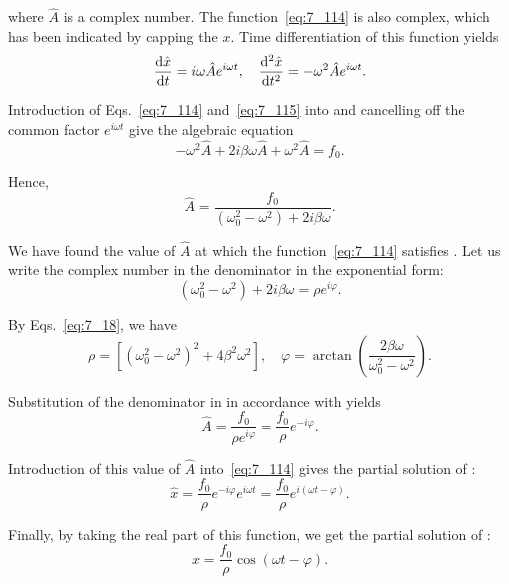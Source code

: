 \noindent
where $\hat{A}$ is a complex number. The function~\eqref{eq:7_114} is also complex, which has been indicated by capping the $x$. Time differentiation of this function yields
\begin{equation}\label{eq:7_115}
	\frac{\mathrm{d}\hat{x}}{\mathrm{d} t} = i\omega \hat{A} e^{i\omega t},\quad \frac{\mathrm{d}^2\hat{x}}{\mathrm{d} t^2} = -\omega^2 \hat{A} e^{i\omega t}.
\end{equation}

\noindent
Introduction of Eqs.~\eqref{eq:7_114} and~\eqref{eq:7_115} into  and cancelling off the common factor $e^{i\omega t}$ give the algebraic equation
\begin{equation*}
	- \omega^2 \hat{A} + 2i\beta\omega\hat{A} + \omega^2\hat{A} = f_0.
\end{equation*}

\noindent
Hence,
\begin{equation}\label{eq:7_116}
	\hat{A} = \frac{f_0}{\left(\omega_0^2 - \omega^2\right) + 2i\beta\omega}.
\end{equation}

\noindent
We have found the value of $\hat{A}$ at which the function~\eqref{eq:7_114} satisfies . Let us write the complex number in the denominator in the exponential form:
\begin{equation}\label{eq:7_117}
	\left(\omega_0^2 - \omega^2\right) + 2i\beta\omega = \rho e^{i\varphi}.
\end{equation}

\noindent
By Eqs.~\eqref{eq:7_18}, we have
\begin{equation}\label{eq:7_118}
	\rho = \left[\left(\omega_0^2 - \omega^2\right)^2 + 4\beta^2\omega^2\right],\quad  \varphi = \arctan\left(\frac{2\beta\omega}{\omega_0^2 - \omega^2}\right).
\end{equation}

Substitution of the denominator in  in accordance with  yields
\begin{equation*}
	\hat{A} = \frac{f_0}{\rho e^{i\varphi}} = \frac{f_0}{\rho}e^{-i\varphi}.
\end{equation*}

\noindent
Introduction of this value of $\hat{A}$ into~\eqref{eq:7_114} gives the partial solution of :
\begin{equation*}
	\hat{x} = \frac{f_0}{\rho} e^{-i\varphi} e^{i\omega t} = \frac{f_0}{\rho} e^{i(\omega t-\varphi)}.
\end{equation*}

\noindent
Finally, by taking the real part of this function, we get the partial solution of :
\begin{equation*}
	x = \frac{f_0}{\rho} \cos(\omega t-\varphi).
\end{equation*}

